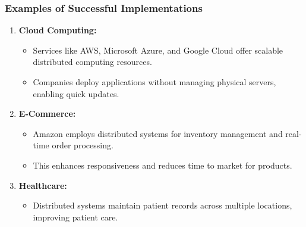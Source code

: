 \documentclass[aspectratio=169]{beamer}
\begin{document}
\begin{frame}[fragile]
    \frametitle{Examples of Successful Implementations}
    \begin{enumerate}
        \item \textbf{Cloud Computing:}
            \begin{itemize}
                \item Services like AWS, Microsoft Azure, and Google Cloud offer scalable distributed computing resources.
                \item Companies deploy applications without managing physical servers, enabling quick updates.
            \end{itemize}
            
        \item \textbf{E-Commerce:}
            \begin{itemize}
                \item Amazon employs distributed systems for inventory management and real-time order processing.
                \item This enhances responsiveness and reduces time to market for products.
            \end{itemize}
            
        \item \textbf{Healthcare:}
            \begin{itemize}
                \item Distributed systems maintain patient records across multiple locations, improving patient care.
            \end{itemize}
    \end{enumerate}
\end{frame}
\end{document}
